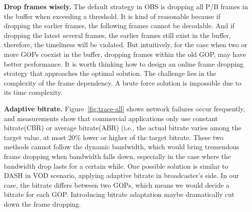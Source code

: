 
\textbf{Drop frames wisely.} The default strategy in OBS is dropping all P/B frames in the buffer when exceeding a threshold. It is kind of reasonable because if dropping the earlier frames, the following frames cannot be decodable. And if dropping the latest several frames, the earlier frames still exist in the buffer, therefore, the timeliness will be violated. But intuitively, for the case when two or more GOPs coexist in the buffer, dropping frames within the old GOP, may have better performance. It is worth thinking how to design an online frame dropping strategy that approaches the optimal solution. The challenge lies in the complexity of the frame dependency. A brute force solution is impossible due to its time complexity.

\textbf{Adaptive bitrate.} Figure~\ref{fig:trace-all} shows network failures occur frequently, and measurements show that commercial applications only use constant bitrate(CBR) or average bitrate(ABR) (i.e., the actual bitrate varies among the target value, at most $20\%$ lower or higher of the target bitrate. These two methods cannot follow the dynamic bandwidth, which would bring tremendous frame dropping when bandwidth falls down, especially in the case where the bandwidth drop lasts for a certain while. One possible solution is similar to DASH in VOD scenario, applying adaptive bitrate in broadcaster's side. In our case, the bitrate differs between two GOPs, which means we would decide a bitrate for each GOP. Introducing bitrate adaptation maybe dramatically cut down the frame dropping.

